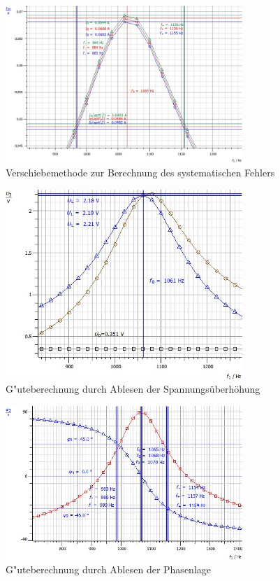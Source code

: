 \documentclass[12pt,a4paper]{article}
\begin{document}
\begin{figure}[H]
	\centering
	\includegraphics[width=0.8\textwidth]{Daten/S1Ohm_f0_sys.jpg}
	\caption{Verschiebemethode zur Berechnung des systematischen Fehlers}
	\label{S1Ohm_f0_sys}
\end{figure}\begin{figure}[H]
	\centering
	\includegraphics[width=0.8\textwidth]{Daten/S1Ohm_U.jpg}
	\caption{G"uteberechnung durch Ablesen der Spannungsüberhöhung}
	\label{S1Ohm_U}
\end{figure}\begin{figure}[H]
	\centering
	\includegraphics[width=0.8\textwidth]{Daten/S1Ohm_phi.jpg}
	\caption{G"uteberechnung durch Ablesen der Phasenlage}
	\label{S1Ohm_phi}
\end{figure}
\end{document}
